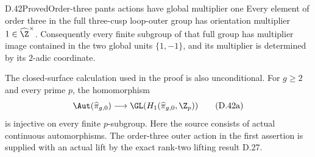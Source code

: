 \begin{claim}{D.42}{Proved}{Order-three pants actions have global multiplier one}
Every element of order three in the full three-cusp
loop-outer group has orientation multiplier
$1\in\widehat\Z^\times$.
Consequently every finite subgroup of that full
group has multiplier image contained in the two
global units $\{1,-1\}$, and its multiplier is
determined by its $2$-adic coordinate.

The closed-surface calculation used in the proof is
also unconditional.  For $g\geq2$ and every prime $p$,
the homomorphism
\[
 \Aut(\widehat\pi_{g,0})
       \longrightarrow\GL(H_1(\widehat\pi_{g,0},\Z_p))
                                                        \tag{D.42a}
\]
is injective on every finite $p$-subgroup.
Here the source consists of actual continuous
automorphisms.  The order-three outer action in the
first assertion is supplied with an actual lift by
the exact rank-two lifting result D.27.
\end{claim}
